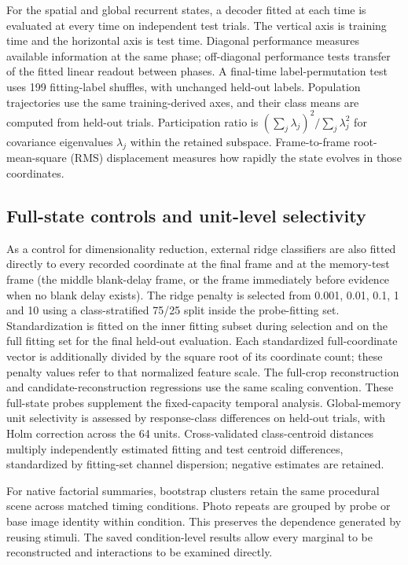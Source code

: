 \documentclass[11pt]{article}
\begin{document}
For the spatial and global recurrent states, a decoder fitted at each time is evaluated at every time on independent test trials. The vertical axis is training time and the horizontal axis is test time. Diagonal performance measures available information at the same phase; off-diagonal performance tests transfer of the fitted linear readout between phases. A final-time label-permutation test uses 199 fitting-label shuffles, with unchanged held-out labels. Population trajectories use the same training-derived axes, and their class means are computed from held-out trials. Participation ratio is $(\sum_j\lambda_j)^2/\sum_j\lambda_j^2$ for covariance eigenvalues $\lambda_j$ within the retained subspace. Frame-to-frame root-mean-square (RMS) displacement measures how rapidly the state evolves in those coordinates.
\subsection{Full-state controls and unit-level selectivity}
As a control for dimensionality reduction, external ridge classifiers are also fitted directly to every recorded coordinate at the final frame and at the memory-test frame (the middle blank-delay frame, or the frame immediately before evidence when no blank delay exists). The ridge penalty is selected from 0.001, 0.01, 0.1, 1 and 10 using a class-stratified 75/25 split inside the probe-fitting set. Standardization is fitted on the inner fitting subset during selection and on the full fitting set for the final held-out evaluation. Each standardized full-coordinate vector is additionally divided by the square root of its coordinate count; these penalty values refer to that normalized feature scale. The full-crop reconstruction and candidate-reconstruction regressions use the same scaling convention. These full-state probes supplement the fixed-capacity temporal analysis. Global-memory unit selectivity is assessed by response-class differences on held-out trials, with Holm correction across the 64 units. Cross-validated class-centroid distances multiply independently estimated fitting and test centroid differences, standardized by fitting-set channel dispersion; negative estimates are retained.

For native factorial summaries, bootstrap clusters retain the same procedural scene across matched timing conditions. Photo repeats are grouped by probe or base image identity within condition. This preserves the dependence generated by reusing stimuli. The saved condition-level results allow every marginal to be reconstructed and interactions to be examined directly.
\end{document}
